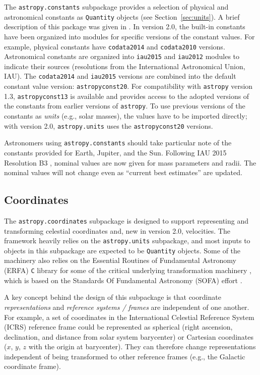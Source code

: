 \documentclass[modern]{aastex61}
\newcommand{\package}[1]{\texttt{#1}\xspace}
\newcommand{\astropypkg}{\package{astropy}}
\newcommand{\sectionname}{Section\xspace}
\begin{document}
The \texttt{astropy.constants} subpackage provides a selection of physical and
astronomical constants as \texttt{Quantity} objects (see
\sectionname~\ref{sec:units}).
A brief description of this package was given in \citep{astropy}.
In version 2.0, the built-in constants have been organized into modules for
specific versions of the constant values.
For example, physical constants have \texttt{codata2014} \citep{codata2014} and
\texttt{codata2010} versions.
Astronomical constants are organized into \texttt{iau2015} and \texttt{iau2012}
modules to indicate their sources (resolutions from the International
Astronomical Union, IAU).
The \texttt{codata2014} and \texttt{iau2015} versions are combined into the
default constant value version: \texttt{astropyconst20}.
For compatibility with \astropypkg version 1.3,  \texttt{astropyconst13}
is available and provides access to the adopted versions of the
constants from earlier versions of \astropypkg.
To use previous versions of the constants as \emph{units} (e.g., solar masses),
the values have to be imported directly; with version
2.0, \texttt{astropy.units} uses the \texttt{astropyconst20} versions.

Astronomers using \texttt{astropy.constants} should take particular note of the
constants provided for Earth, Jupiter, and the Sun.
Following IAU 2015 Resolution B3 \citep{iau2015b3}, nominal values are now given
for mass parameters and radii.
The nominal values will not change even as ``current best estimates'' are
updated.

\subsection{Coordinates}
\label{sec:coordinates}
The \package{astropy.coordinates} subpackage is designed to support representing
and transforming celestial coordinates and, new in version 2.0, velocities.
The framework heavily relies on the \package{astropy.units} subpackage, and most
inputs to objects in this subpackage are expected to be \texttt{Quantity}
objects.
Some of the machinery also relies on the Essential Routines of Fundamental
Astronomy (ERFA) \texttt{C} library for some of the critical underlying
transformation machinery \citep{erfa}, which is based on the Standards Of
Fundamental Astronomy (SOFA) effort \citep{sofa}.

A key concept behind the design of this subpackage is that coordinate
\textit{representations} and \textit{reference systems / frames} are independent
of one another.
For example, a set of coordinates in the International Celestial Reference
System (ICRS) reference frame could be represented as spherical (right
ascension, declination, and distance from solar system barycenter) or Cartesian
coordinates ($x$, $y$, $z$ with the origin at barycenter).
They can therefore change representations independent of being transformed to
other reference frames (e.g., the Galactic coordinate frame).
\end{document}
